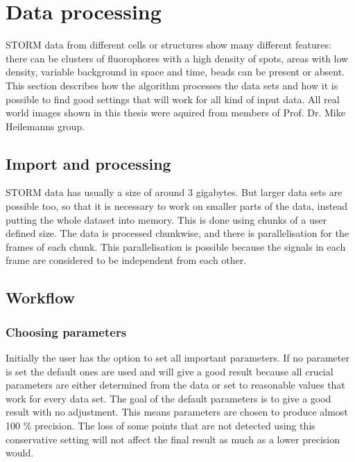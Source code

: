 \chapter{Data processing}
STORM data from different cells or structures show many different features: there can be clusters of fluorophores with a high density of spots, areas with low density, variable background in space and time, beads can be present or absent.\newline
This section describes how the algorithm processes the data sets and how it is possible to find good settings that will work for all kind of input data.\newline
All real world images shown in this thesis were aquired from members of Prof. Dr. Mike Heilemanns group.


\section{Import and processing}
STORM data has usually a size of around 3 gigabytes. But larger data sets are possible too, so that it is necessary to work on smaller parts of the data, instead putting the whole dataset into memory. This is done using chunks of a user defined size. The data is processed chunkwise, and there is parallelisation for the frames of each chunk. This parallelisation is possible because the signals in each frame are considered to be independent from each other.  

\section{Workflow}
\subsection{Choosing parameters}
Initially the user has the option to set all important parameters. If no parameter is set the default ones are used and will give a good result because all crucial parameters are either determined from the data or set to reasonable values that work for every data set. The goal of the default parameters is to give a good result with no adjustment. This means parameters are chosen to produce almost 100 \% precision. The loss of some points that are not detected using this conservative setting will not affect the final result as much as a lower precision would.
